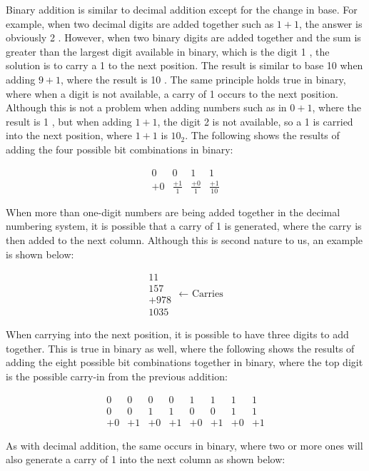 \documentclass[10pt]{article}
\begin{document}
Binary addition is similar to decimal addition except for the change in base. For example, when two decimal digits are added together such as $1+1$, the answer is obviously 2 . However, when two binary digits are added together and the sum is greater than the largest digit available in binary, which is the digit 1 , the solution is to carry a 1 to the next position. The result is similar to base 10 when adding $9+1$, where the result is 10 . The same principle holds true in binary, where when a digit is not available, a carry of 1 occurs to the next position. Although this is not a problem when adding numbers such as in $0+1$, where the result is 1 , but when adding $1+1$, the digit 2 is not available, so a 1 is carried into the next position, where $1+1$ is $10_{2}$. The following shows the results of adding the four possible bit combinations in binary:

$$
\begin{array}{rrrr}
0 & 0 & 1 & 1 \\
+0 & \frac{+1}{1} & \frac{+0}{1} & \frac{+1}{10}
\end{array}
$$

When more than one-digit numbers are being added together in the decimal numbering system, it is possible that a carry of 1 is generated, where the carry is then added to the next column. Although this is second nature to us, an example is shown below:

$$
\begin{array}{r}
11 \\
157 \\
+978 \\
\hline 1035
\end{array} \text { ← Carries }
$$

When carrying into the next position, it is possible to have three digits to add together. This is true in binary as well, where the following shows the results of adding the eight possible bit combinations together in binary, where the top digit is the possible carry-in from the previous addition:

$$
\begin{array}{rrrrrrrr}
0 & 0 & 0 & 0 & 1 & 1 & 1 & 1 \\
0 & 0 & 1 & 1 & 0 & 0 & 1 & 1 \\
+0 & +1 & +0 & +1 & +0 & +1 & +0 & +1
\end{array}
$$

As with decimal addition, the same occurs in binary, where two or more ones will also generate a carry of 1 into the next column as shown below:
\end{document}
